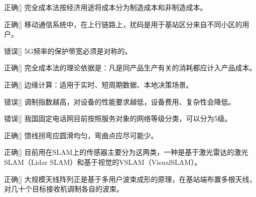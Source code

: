 \begin{choice}{\;正确\;}[]
    完全成本法按经济用途将成本分为制造成本和非制造成本。

\end{choice}


\begin{choice}{\;正确\;}[]
    移动通信系统中，在上行链路上，扰码是用于基站区分来自不同小区的用户。

\end{choice}


\begin{choice}{\;错误\;}[]
    5G频率的保护带宽必须是对称的。

\end{choice}

\begin{choice}{\;正确\;}[]
    完全成本法的理论依据是：凡是同产品生产有关的消耗都应计入产品成本。

\end{choice}


\begin{choice}{\;正确\;}[]
    边缘计算：适用于实时、短周期数据、本地决策场景。

\end{choice}


\begin{choice}{\;错误\;}[]
    调制指数越高，对设备的性能要求越低，设备费用、复杂性会降低。

\end{choice}


\begin{choice}{\;错误\;}[]
    我国固定电话网目前按照服务对象的网络等级分类，可以分为5级。

\end{choice}


\begin{choice}{\;正确\;}[]
    馈线拐弯应圆滑均匀，弯曲点应尽可能少。

\end{choice}


\begin{choice}{\;正确\;}[]
    目前用在SLAM上的传感器主要分为这两类，一种是基于激光雷达的激光SLAM（Lidar SLAM）和基于视觉的VSLAM（VisualSLAM）。

\end{choice}


\begin{choice}{\;正确\;}[]
    大规模天线阵列正是基于多用户波束成形的原理，在基站端布置多根天线，对几十个目标接收机调制各自的波束。

\end{choice}


